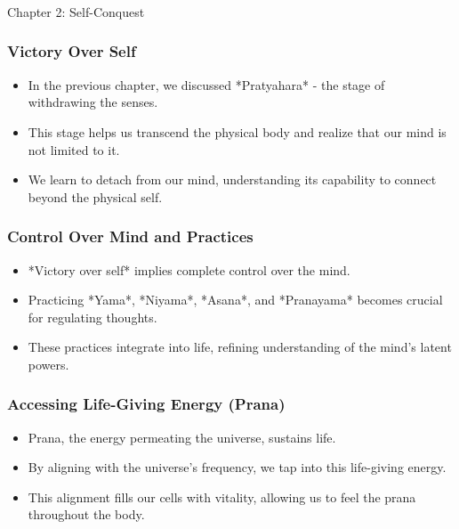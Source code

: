 \begin{frame}[fragile]\frametitle{}
\begin{center}
{\Large Chapter 2: Self-Conquest }
\end{center}
\end{frame}

\begin{frame}[fragile]\frametitle{Victory Over Self}
    \begin{itemize}
        \item In the previous chapter, we discussed *Pratyahara* - the stage of withdrawing the senses.
        \item This stage helps us transcend the physical body and realize that our mind is not limited to it.
        \item We learn to detach from our mind, understanding its capability to connect beyond the physical self.
    \end{itemize}
\end{frame}

\begin{frame}[fragile]\frametitle{Control Over Mind and Practices}
    \begin{itemize}
        \item *Victory over self* implies complete control over the mind.
        \item Practicing *Yama*, *Niyama*, *Asana*, and *Pranayama* becomes crucial for regulating thoughts.
        \item These practices integrate into life, refining understanding of the mind's latent powers.
    \end{itemize}
\end{frame}

\begin{frame}[fragile]\frametitle{Accessing Life-Giving Energy (Prana)}
    \begin{itemize}
        \item Prana, the energy permeating the universe, sustains life.
        \item By aligning with the universe's frequency, we tap into this life-giving energy.
        \item This alignment fills our cells with vitality, allowing us to feel the prana throughout the body.
    \end{itemize}
\end{frame}

